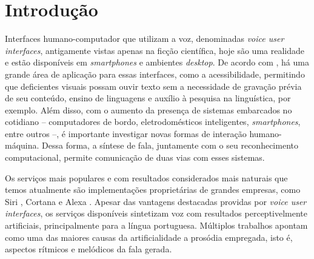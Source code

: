 


\chapter{Introdução}

Interfaces humano-computador que utilizam a voz, denominadas \emph{voice user
  interfaces}, antigamente vistas apenas na ficção científica, hoje são uma
realidade e estão disponíveis em \emph{smartphones} e ambientes \emph{desktop}.
De acordo com , há uma grande área de aplicação
para essas interfaces, como a acessibilidade, permitindo que
deficientes visuais possam ouvir texto sem a necessidade de gravação prévia de
seu conteúdo, ensino de linguagens e auxílio à pesquisa na linguística, por
exemplo. Além disso, com o aumento da presença de sistemas embarcados no
cotidiano -- computadores de bordo, eletrodomésticos inteligentes,
\emph{smartphones}, entre outros --, é importante investigar novas formas de interação
humano-máquina. Dessa forma, a síntese de fala, juntamente com o seu
reconhecimento computacional, permite comunicação de duas vias com esses
sistemas.


Os serviços mais populares e com resultados considerados mais naturais que temos
atualmente são implementações proprietárias de grandes empresas, como Siri
\cite{siri}, Cortana \cite{cortana} e Alexa \cite{alexa}. Apesar das vantagens
destacadas providas por \emph{voice user interfaces}, os serviços
disponíveis sintetizam voz com resultados perceptivelmente artificiais,
principalmente para a língua portuguesa. Múltiplos trabalhos
\cite{hirschberg,prosodysurvey,taylor2009} apontam como uma das maiores causas
da artificialidade a prosódia empregada, isto é, aspectos rítmicos e melódicos
da fala gerada.

